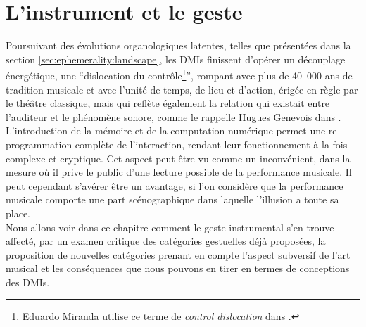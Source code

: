 %
\chapter{L'instrument et le geste}
\label{ch:gesture}


\vspace*{\fill}

\noindent Poursuivant des évolutions organologiques latentes, telles que présentées dans la section \ref{sec:ephemerality:landscape}, les \glspl{DMI} finissent d'opérer un découplage énergétique, une ``dislocation du contrôle\footnote{Eduardo Miranda utilise ce terme de \textit{control dislocation} dans \cite{miranda_new_2006}.}'', rompant avec plus de 40~000 ans de tradition musicale \cite{conard_new_2009} et avec l'unité de temps, de lieu et d'action, érigée en règle par le théâtre classique, mais qui reflète également la relation qui existait entre l'auditeur et le phénomène sonore, comme le rappelle Hugues Genevois dans \cite{cance_what_2012}.\\
\indent L'introduction de la mémoire et de la computation numérique permet une re-programmation complète de l'interaction, rendant leur fonctionnement à la fois complexe et cryptique. Cet aspect peut être vu comme un inconvénient, dans la mesure où il prive le public d’une lecture possible de la performance musicale. Il peut cependant s’avérer être un avantage, si l'on considère que la performance musicale comporte une part scénographique dans laquelle l’illusion a toute sa place. \\
\indent Nous allons voir dans ce chapitre comment le geste instrumental s'en trouve affecté, par un examen critique des catégories gestuelles déjà proposées, la proposition de nouvelles catégories prenant en compte l'aspect subversif de l'art musical et les conséquences que nous pouvons en tirer en termes de conceptions des \glspl{DMI}.

